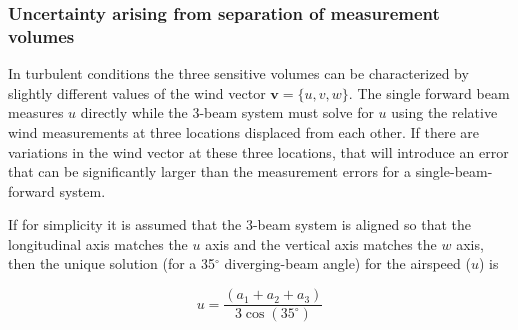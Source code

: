 \documentclass[12pt,twoside,english]{article}\usepackage[]{graphicx}\usepackage[]{color}
\let\OrgIndex\index
\renewcommand*{\index}[1]{\OrgIndex{#1}}
\begin{document}
\subsubsection{Uncertainty arising from separation of measurement volumes}


In turbulent conditions  the three sensitive volumes can be characterized by slightly different values of the wind vector $\mathbf{v}=\{u,v,w\}.$ The single forward beam measures $u$ directly while the 3-beam system must solve for $u$ using the relative wind measurements at three locations displaced from each other. If there are variations in the wind vector at these three locations, that will introduce an error that can be significantly larger than the measurement errors for a single-beam-forward system. 

If for simplicity it is assumed that the 3-beam system is aligned so that the longitudinal axis matches the $u$ axis and the vertical axis matches the $w$ axis, then the unique solution (for a 35$^{\circ}$ diverging-beam angle) for the airspeed ($u$) is 

\begin{equation}
u=\frac{(a_{1}+a_{2}+a_{3})}{3\cos(35^{\circ})}\label{eq:TAS3beam} 
\end{equation}
\end{document}
